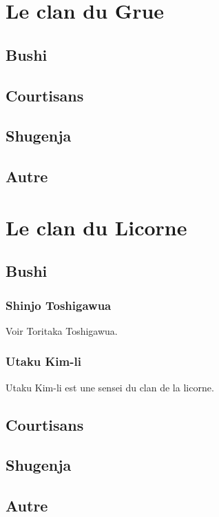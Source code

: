 \documentclass[10pt,a4paper]{book}
\begin{document}
\chapter{Le clan du Grue}

\section{Bushi}

\section{Courtisans}

\section{Shugenja}

\section{Autre}


\chapter{Le clan du Licorne}

\section{Bushi}

\subsection{Shinjo Toshigawua}
Voir Toritaka Toshigawua.

\subsection{Utaku Kim-li}

Utaku Kim-li est une sensei du clan de la licorne.

\section{Courtisans}

\section{Shugenja}

\section{Autre}
\end{document}
